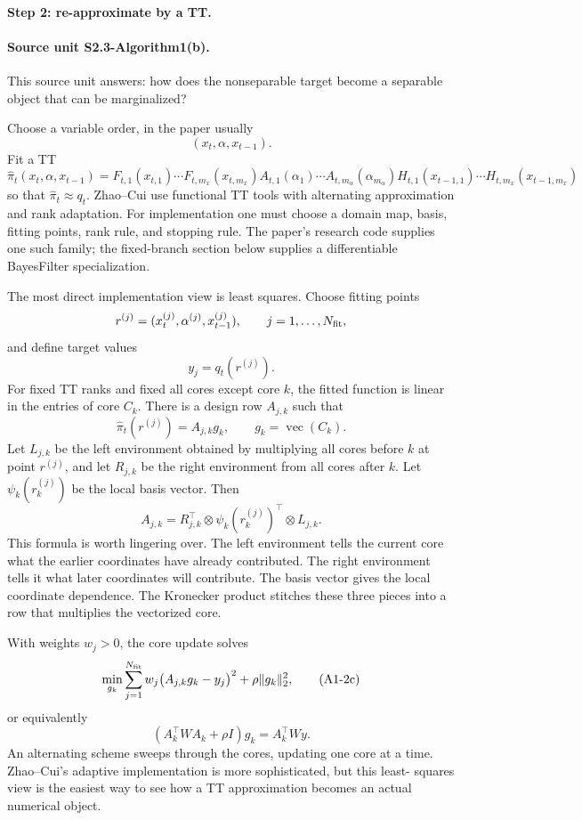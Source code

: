 \documentclass[11pt]{article}
\newcommand{\vecop}{\operatorname{vec}}
\begin{document}
\paragraph{Step 2: re-approximate by a TT.}
\paragraph{Source unit S2.3-Algorithm1(b).}
This source unit answers: how does the nonseparable target become a separable
object that can be marginalized?

Choose a variable order, in the paper usually
\[
    (x_t,\alpha,x_{t-1}).
\]
Fit a TT
\[
    \widehat\pi_t(x_t,\alpha,x_{t-1})
    =
    F_{t,1}(x_{t,1})\cdots F_{t,m_x}(x_{t,m_x})
    A_{t,1}(\alpha_1)\cdots A_{t,m_\alpha}(\alpha_{m_\alpha})
    H_{t,1}(x_{t-1,1})\cdots H_{t,m_x}(x_{t-1,m_x})
    \tag{A1-2}
\]
so that \(\widehat\pi_t\approx q_t\).  Zhao--Cui use functional TT tools with
alternating approximation and rank adaptation.  For implementation one must
choose a domain map, basis, fitting points, rank rule, and stopping rule.  The
paper's research code supplies one such family; the fixed-branch section below
supplies a differentiable BayesFilter specialization.

The most direct implementation view is least squares.  Choose fitting points
\[
    r^{(j)}=(x_t^{(j)},\alpha^{(j)},x_{t-1}^{(j)}),
    \qquad j=1,\ldots,N_{\rm fit},
\]
and define target values
\[
    y_j=q_t(r^{(j)}).
\]
For fixed TT ranks and fixed all cores except core \(k\), the fitted function is
linear in the entries of core \(C_k\).  There is a design row \(A_{j,k}\) such
that
\[
    \widehat\pi_t(r^{(j)})=A_{j,k}g_k,
    \qquad g_k=\vecop(C_k).
    \tag{A1-2a}
\]
Let \(L_{j,k}\) be the left environment obtained by multiplying all cores before
\(k\) at point \(r^{(j)}\), and let \(R_{j,k}\) be the right environment from
all cores after \(k\).  Let
\(\psi_k(r_k^{(j)})\) be the local basis vector.  Then
\[
    A_{j,k}
    =
    R_{j,k}^{\top}\otimes \psi_k(r_k^{(j)})^\top\otimes L_{j,k}.
    \tag{A1-2b}
\]
This formula is worth lingering over.  The left environment tells the current
core what the earlier coordinates have already contributed.  The right
environment tells it what later coordinates will contribute.  The basis vector
gives the local coordinate dependence.  The Kronecker product stitches these
three pieces into a row that multiplies the vectorized core.

With weights \(w_j>0\), the core update solves
\[
    \min_{g_k}
    \sum_{j=1}^{N_{\rm fit}}w_j\bigl(A_{j,k}g_k-y_j\bigr)^2
    +\rho\|g_k\|_2^2,
    \tag{A1-2c}
\]
or equivalently
\[
    (A_k^\top W A_k+\rho I)g_k=A_k^\top Wy.
    \tag{A1-2d}
\]
An alternating scheme sweeps through the cores, updating one core at a time.
Zhao--Cui's adaptive implementation is more sophisticated, but this least-
squares view is the easiest way to see how a TT approximation becomes an
actual numerical object.
\end{document}
